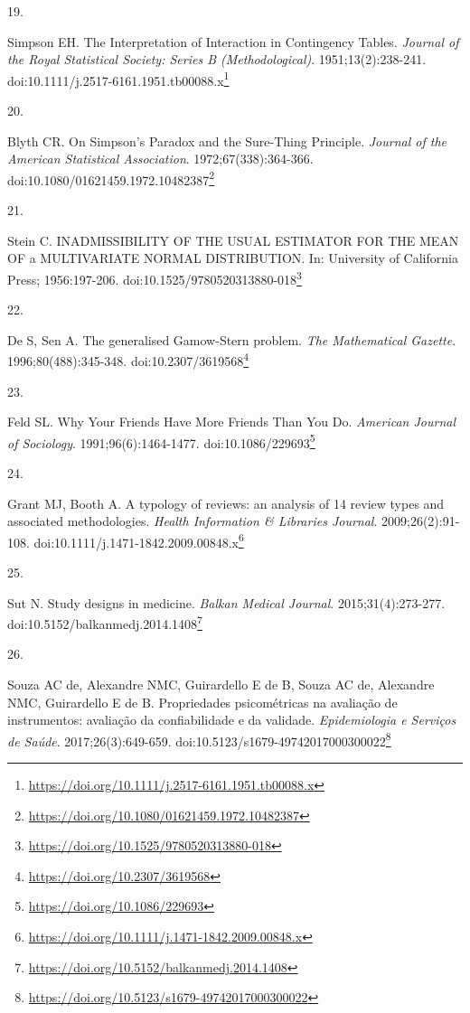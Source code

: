 \documentclass[
  a4paper,
]{book}
\newlength{\cslhangindent}
\newlength{\csllabelwidth}
\newlength{\cslentryspacingunit} %
\newenvironment{CSLReferences}[2] %
 {%
  \setlength{\parindent}{0pt}
  \ifodd #1
  \let\oldpar\par
  \def\par{\hangindent=\cslhangindent\oldpar}
  \fi
  \setlength{\parskip}{#2\cslentryspacingunit}
 }%
 {}
\newcommand{\CSLLeftMargin}[1]{\parbox[t]{\csllabelwidth}{#1}}
\newcommand{\CSLRightInline}[1]{\parbox[t]{\linewidth - \csllabelwidth}{#1}\break}
\renewcommand{\href}[2]{#2\footnote{\url{#1}}}
\begin{document}
\begin{CSLReferences}{0}{0}
\leavevmode{}%
\CSLLeftMargin{19. }%
\CSLRightInline{Simpson EH. The Interpretation of Interaction in Contingency Tables. \emph{Journal of the Royal Statistical Society: Series B (Methodological)}. 1951;13(2):238-241. doi:\href{https://doi.org/10.1111/j.2517-6161.1951.tb00088.x}{10.1111/j.2517-6161.1951.tb00088.x}}

\leavevmode{}%
\CSLLeftMargin{20. }%
\CSLRightInline{Blyth CR. On Simpson's Paradox and the Sure-Thing Principle. \emph{Journal of the American Statistical Association}. 1972;67(338):364-366. doi:\href{https://doi.org/10.1080/01621459.1972.10482387}{10.1080/01621459.1972.10482387}}

\leavevmode{}%
\CSLLeftMargin{21. }%
\CSLRightInline{Stein C. INADMISSIBILITY OF THE USUAL ESTIMATOR FOR THE MEAN OF a MULTIVARIATE NORMAL DISTRIBUTION. In: University of California Press; 1956:197-206. doi:\href{https://doi.org/10.1525/9780520313880-018}{10.1525/9780520313880-018}}

\leavevmode{}%
\CSLLeftMargin{22. }%
\CSLRightInline{De S, Sen A. The generalised Gamow-Stern problem. \emph{The Mathematical Gazette}. 1996;80(488):345-348. doi:\href{https://doi.org/10.2307/3619568}{10.2307/3619568}}

\leavevmode{}%
\CSLLeftMargin{23. }%
\CSLRightInline{Feld SL. Why Your Friends Have More Friends Than You Do. \emph{American Journal of Sociology}. 1991;96(6):1464-1477. doi:\href{https://doi.org/10.1086/229693}{10.1086/229693}}

\leavevmode{}%
\CSLLeftMargin{24. }%
\CSLRightInline{Grant MJ, Booth A. A typology of reviews: an analysis of 14 review types and associated methodologies. \emph{Health Information \& Libraries Journal}. 2009;26(2):91-108. doi:\href{https://doi.org/10.1111/j.1471-1842.2009.00848.x}{10.1111/j.1471-1842.2009.00848.x}}

\leavevmode{}%
\CSLLeftMargin{25. }%
\CSLRightInline{Sut N. Study designs in medicine. \emph{Balkan Medical Journal}. 2015;31(4):273-277. doi:\href{https://doi.org/10.5152/balkanmedj.2014.1408}{10.5152/balkanmedj.2014.1408}}

\leavevmode{}%
\CSLLeftMargin{26. }%
\CSLRightInline{Souza AC de, Alexandre NMC, Guirardello E de B, Souza AC de, Alexandre NMC, Guirardello E de B. Propriedades psicométricas na avaliação de instrumentos: avaliação da confiabilidade e da validade. \emph{Epidemiologia e Serviços de Saúde}. 2017;26(3):649-659. doi:\href{https://doi.org/10.5123/s1679-49742017000300022}{10.5123/s1679-49742017000300022}}


\end{CSLReferences}
\end{document}
